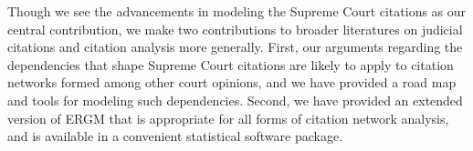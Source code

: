 \documentclass{cup-pan}
\begin{document}
Though we see the advancements in modeling the Supreme Court citations as our central contribution, we make two contributions to broader literatures on judicial citations and citation analysis more generally. First, our arguments regarding the dependencies that shape Supreme Court citations are likely to apply to citation networks formed among other court opinions, and we have provided a road map and tools for modeling such dependencies. Second, we have provided an extended version of ERGM that is appropriate for all forms of citation network analysis, and is available in a convenient statistical software package.

\printbibliography
\end{document}
